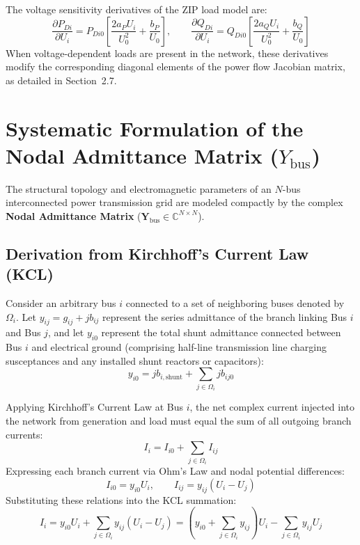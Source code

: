 \documentclass[12pt,a4paper,oneside]{report}
\begin{document}
The voltage sensitivity derivatives of the ZIP load model are:
\begin{equation}
\frac{\partial P_{Di}}{\partial U_i} = P_{Di0} \left[ \frac{2 a_P U_i}{U_0^2} + \frac{b_P}{U_0} \right], \qquad \frac{\partial Q_{Di}}{\partial U_i} = Q_{Di0} \left[ \frac{2 a_Q U_i}{U_0^2} + \frac{b_Q}{U_0} \right]
\end{equation}
When voltage-dependent loads are present in the network, these derivatives modify the corresponding diagonal elements of the power flow Jacobian matrix, as detailed in Section~2.7.

\section{Systematic Formulation of the Nodal Admittance Matrix ($Y_{\text{bus}}$)}
The structural topology and electromagnetic parameters of an $N$-bus interconnected power transmission grid are modeled compactly by the complex \textbf{Nodal Admittance Matrix} ($\mathbf{Y}_{\text{bus}} \in \mathbb{C}^{N \times N}$).

\subsection{Derivation from Kirchhoff's Current Law (KCL)}
Consider an arbitrary bus $i$ connected to a set of neighboring buses denoted by $\Omega_i$. Let $y_{ij} = g_{ij} + jb_{ij}$ represent the series admittance of the branch linking Bus $i$ and Bus $j$, and let $y_{i0}$ represent the total shunt admittance connected between Bus $i$ and electrical ground (comprising half-line transmission line charging susceptances and any installed shunt reactors or capacitors):
\begin{equation}
y_{i0} = j b_{i,\text{shunt}} + \sum_{j \in \Omega_i} j b_{ij0}
\end{equation}

Applying Kirchhoff's Current Law at Bus $i$, the net complex current injected into the network from generation and load must equal the sum of all outgoing branch currents:
\begin{equation}
I_i = I_{i0} + \sum_{j \in \Omega_i} I_{ij}
\end{equation}
Expressing each branch current via Ohm's Law and nodal potential differences:
\begin{equation}
I_{i0} = y_{i0} U_i, \qquad I_{ij} = y_{ij} (U_i - U_j)
\end{equation}
Substituting these relations into the KCL summation:
\begin{equation}
I_i = y_{i0} U_i + \sum_{j \in \Omega_i} y_{ij} (U_i - U_j) = \left( y_{i0} + \sum_{j \in \Omega_i} y_{ij} \right) U_i - \sum_{j \in \Omega_i} y_{ij} U_j
\end{equation}
\end{document}
